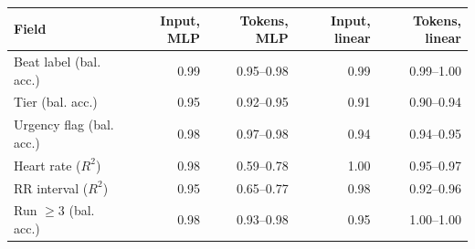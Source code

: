 \begin{tabular}{lrrrr}
\toprule
Field & Input, MLP & Tokens, MLP & Input, linear & Tokens, linear \\
\midrule
Beat label (bal. acc.) & 0.99 & 0.95--0.98 & 0.99 & 0.99--1.00 \\
Tier (bal. acc.) & 0.95 & 0.92--0.95 & 0.91 & 0.90--0.94 \\
Urgency flag (bal. acc.) & 0.98 & 0.97--0.98 & 0.94 & 0.94--0.95 \\
Heart rate ($R^2$) & 0.98 & 0.59--0.78 & 1.00 & 0.95--0.97 \\
RR interval ($R^2$) & 0.95 & 0.65--0.77 & 0.98 & 0.92--0.96 \\
Run $\geq 3$ (bal. acc.) & 0.98 & 0.93--0.98 & 0.95 & 1.00--1.00 \\
\bottomrule
\end{tabular}

